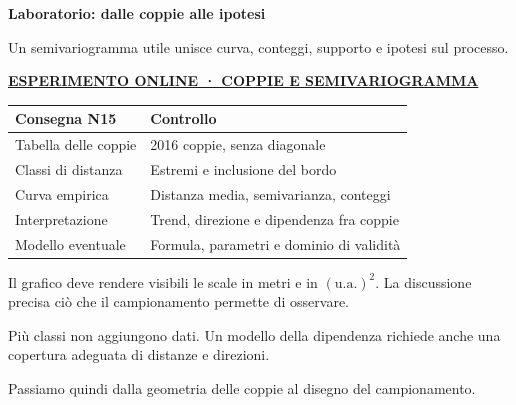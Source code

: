 \documentclass[12pt,aspectratio=1610]{beamer}
\newcommand{\PBody}[1]{\par{\fontsize{11.3}{14.8}\selectfont #1\par}}
\newcommand{\PSmall}[1]{\par{\fontsize{9.8}{13.1}\selectfont #1\par}}
\newcommand{\PInfo}[1]{%
\begin{tcolorbox}[enhanced,arc=1.6mm,boxrule=.55pt,colback=GeoTint,
 colframe=Rule!80!Classical,left=2.3mm,right=2.3mm,top=2mm,bottom=2mm,
 before skip=1mm,after skip=1mm]
\PSmall{#1}\end{tcolorbox}}
\newcommand{\PLab}[2]{\par{\color{Classical}\bfseries\fontsize{9}{11}\selectfont
\href{#1}{\MakeUppercase{#2}}}\par\vspace{1.8mm}}
\begin{document}
\begin{frame}[plain]\hypertarget{slide81}{}
\begin{lrbox}{\TitleBox}
\begin{minipage}[t]{17.7cm}\raggedright\color{Ink}\fontsize{11.3}{14.8}\selectfont
\color{Navy}\bfseries\fontsize{20.6}{24.5}\selectfont Laboratorio: dalle coppie alle ipotesi
\end{minipage}\end{lrbox}

\begin{lrbox}{\RecallBox}
\begin{minipage}[t]{14.3cm}\raggedright\color{Ink}\fontsize{11.3}{14.8}\selectfont
\fontsize{10.3}{13.8}\selectfont Un semivariogramma utile unisce curva, conteggi, supporto e ipotesi sul processo.
\end{minipage}\end{lrbox}

\begin{lrbox}{\PilotLeftBox}
\begin{minipage}[t]{10.05cm}\raggedright\color{Ink}\fontsize{11.3}{14.8}\selectfont
\PLab{https://marzione00.github.io/Lab_Geo/\#laboratorio/m11-variogramma}{Esperimento online · coppie e semivariogramma}
{\fontsize{10.2}{13.1}\selectfont\renewcommand{\arraystretch}{1.45}\begin{tabular}{@{}p{4.0cm}p{5.0cm}@{}}\toprule
\textbf{Consegna N15} & \textbf{Controllo}\\\midrule
Tabella delle coppie & 2016 coppie, senza diagonale\\
Classi di distanza & Estremi e inclusione del bordo\\
Curva empirica & Distanza media, semivarianza, conteggi\\
Interpretazione & Trend, direzione e dipendenza fra coppie\\
Modello eventuale & Formula, parametri e dominio di validità\\
\bottomrule\end{tabular}}

\end{minipage}\end{lrbox}

\begin{lrbox}{\PilotRightBox}
\begin{minipage}[t]{7.55cm}\raggedright\color{Ink}\fontsize{11.3}{14.8}\selectfont
\PBody{Il grafico deve rendere visibili le scale in metri e in $(\mathrm{u.a.})^2$. La discussione precisa ciò che il campionamento permette di osservare.}
\vspace{2.5mm}
\PInfo{Più classi non aggiungono dati. Un modello della dipendenza richiede anche una copertura adeguata di distanze e direzioni.}
\PBody{Passiamo quindi dalla geometria delle coppie al disegno del campionamento.}
\vspace{2.5mm}


\end{minipage}
\end{lrbox}
\end{frame}
\end{document}
